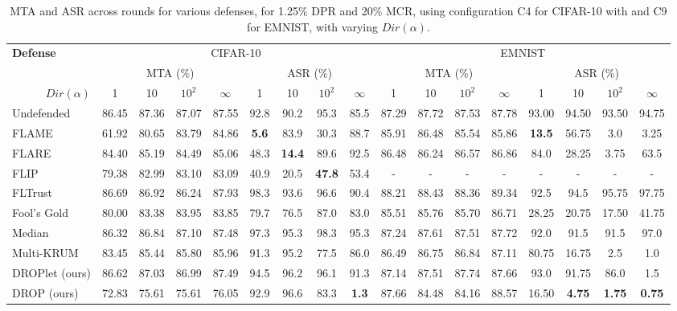 \begin{table*}[th]
    \centering
    \begin{tabular}{l|cccc|cccc|cccc|cccc}
    \toprule
    \multirow{2}{*}{\textbf{Defense}} & \multicolumn{8}{c}{CIFAR-10} & \multicolumn{8}{c}{EMNIST} \\
     & \multicolumn{4}{c}{MTA (\%)} & \multicolumn{4}{c}{ASR (\%)} & \multicolumn{4}{c}{MTA (\%)} & \multicolumn{4}{c}{ASR (\%)} \\
     \cline{2-17}
     \multicolumn{1}{r|}{$Dir(\alpha)$} & 1 & 10 & $10^2$ & $\infty$ & 1 & 10 & $10^2$ & $\infty$ & 1 & 10 & $10^2$ & $\infty$ & 1 & 10 & $10^2$ & $\infty$ \\
    \midrule
    Undefended & 86.45 & 87.36 & 87.07 & 87.55 & 92.8 & 90.2 & 95.3 & 85.5 & 87.29 & 87.72 & 87.53 & 87.78 & 93.00 & 94.50 & 93.50 & 94.75  \\
    \hline
    FLAME & 61.92 & 80.65 & 83.79 & 84.86 & \textbf{5.6} & 83.9 & 30.3 & 88.7 & 85.91 & 86.48 & 85.54 & 85.86 & \textbf{13.5} & 56.75 & 3.0 & 3.25  \\
    FLARE & 84.40 & 85.19 & 84.49 & 85.06 & 48.3 & \textbf{14.4} & 89.6 & 92.5 & 86.48 & 86.24 & 86.57 & 86.86 & 84.0 & 28.25 & 3.75 & 63.5 \\
    FLIP & 79.38 & 82.99 & 83.10 & 83.09 & 40.9 & 20.5 & \textbf{47.8} & 53.4 & - & - & - & - & - & - & - & - \\
    FLTrust & 86.69 & 86.92 & 86.24 & 87.93 & 98.3 & 93.6 & 96.6 & 90.4 & 88.21 & 88.43 & 88.36 & 89.34 & 92.5 & 94.5 & 95.75 & 97.75 \\
    Fool's Gold & 80.00 & 83.38 & 83.95 & 83.85 & 79.7 & 76.5 & 87.0 & 83.0 & 85.51 & 85.76 & 85.70 & 86.71 & 28.25 & 20.75 & 17.50 & 41.75 \\
    Median & 86.32 & 86.84 & 87.10 & 87.48 & 97.3 & 95.3 & 98.3 & 95.3 & 87.24 & 87.61 & 87.51 & 87.72 & 92.0 & 91.5 & 91.5 & 97.0 \\
    Multi-KRUM & 83.45 & 85.44 & 85.80 & 85.96 & 91.3 & 95.2 & 77.5 & 86.0 & 86.49 & 86.75 & 86.84 & 87.11 & 80.75 & 16.75 & 2.5 & 1.0 \\
    \hline
    DROPlet (ours) & 86.62 & 87.03 & 86.99 & 87.49 & 94.5 & 96.2 & 96.1 & 91.3 & 87.14 & 87.51 & 87.74 & 87.66 & 93.0 & 91.75 & 86.0 & 1.5 \\
    DROP (ours) & 72.83 & 75.61 & 75.61 & 76.05 & 92.9 & 96.6 & 83.3 & \textbf{1.3} & 87.66 & 84.48 & 84.16 & 88.57 & 16.50 & \textbf{4.75} & \textbf{1.75} & \textbf{0.75} \\
    \bottomrule
    \end{tabular}
    \caption{MTA and ASR across rounds for various defenses, for 1.25\% DPR and 20\% MCR, using configuration C4 for CIFAR-10 with  and C9 for EMNIST, with varying $Dir(\alpha)$.} 
    \label{tab:noniid}
\end{table*}


